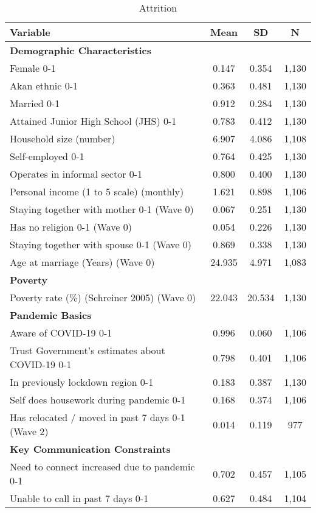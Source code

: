 \begin{ThreePartTable}
\begin{table}[tbp]\centering
\def\sym#1{\ifmmode^{#1}\else\(^{#1}\)\fi}
\caption{Attrition}
\begin{tabular}{lccc}
\hline
Variable & Mean & SD & N \\
\hline\hline
\textbf{Demographic Characteristics} & & & \\ 
Female 0-1 & 0.147 & 0.354 & 1,130 \\ 
Akan ethnic 0-1 & 0.363 & 0.481 & 1,130 \\ 
Married 0-1 & 0.912 & 0.284 & 1,130 \\ 
Attained Junior High School (JHS) 0-1 & 0.783 & 0.412 & 1,130 \\ 
Household size (number) & 6.907 & 4.086 & 1,108 \\ 
Self-employed 0-1 & 0.764 & 0.425 & 1,130 \\ 
Operates in informal sector 0-1 & 0.800 & 0.400 & 1,130 \\ 
Personal income (1 to 5 scale) (monthly) & 1.621 & 0.898 & 1,106 \\ 
Staying together with mother 0-1 (Wave 0) & 0.067 & 0.251 & 1,130 \\ 
Has no religion 0-1 (Wave 0) & 0.054 & 0.226 & 1,130 \\ 
Staying together with spouse 0-1 (Wave 0) & 0.869 & 0.338 & 1,130 \\ 
Age at marriage (Years) (Wave 0) & 24.935 & 4.971 & 1,083 \\ 
\textbf{Poverty} & & & \\ 
Poverty rate (\%) (Schreiner 2005) (Wave 0) & 22.043 & 20.534 & 1,130 \\ 
\textbf{Pandemic Basics} & & & \\ 
Aware of COVID-19 0-1 & 0.996 & 0.060 & 1,106 \\ 
Trust Government's estimates about COVID-19 0-1 & 0.798 & 0.401 & 1,106 \\ 
In previously lockdown region 0-1 & 0.183 & 0.387 & 1,130 \\ 
Self does housework during pandemic 0-1 & 0.168 & 0.374 & 1,106 \\ 
Has relocated / moved in past 7 days 0-1 (Wave 2) & 0.014 & 0.119 & 977 \\ 
\textbf{Key Communication Constraints} & & & \\ 
Need to connect increased due to pandemic 0-1 & 0.702 & 0.457 & 1,105 \\ 
Unable to call in past 7 days 0-1 & 0.627 & 0.484 & 1,104 \\ 

\end{tabular}
\end{table}
\end{ThreePartTable}

